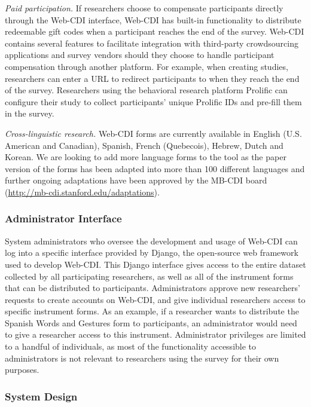 \documentclass[
  english,
  man]{apa7}
\begin{document}
\emph{Paid participation.} If researchers choose to compensate participants directly through the Web-CDI interface, Web-CDI has built-in functionality to distribute redeemable gift codes when a participant reaches the end of the survey. Web-CDI contains several features to facilitate integration with third-party crowdsourcing applications and survey vendors should they choose to handle participant compensation through another platform. For example, when creating studies, researchers can enter a URL to redirect participants to when they reach the end of the survey. Researchers using the behavioral research platform Prolific can configure their study to collect participants' unique Prolific IDs and pre-fill them in the survey.

\emph{Cross-linguistic research.} Web-CDI forms are currently available in English (U.S. American and Canadian), Spanish, French (Quebecois), Hebrew, Dutch and Korean. We are looking to add more language forms to the tool as the paper version of the forms has been adapted into more than 100 different languages and further ongoing adaptations have been approved by the MB-CDI board (\url{http://mb-cdi.stanford.edu/adaptations}).

\hypertarget{administrator-interface}{%
\subsubsection{Administrator Interface}\label{administrator-interface}}

System administrators who oversee the development and usage of Web-CDI can log into a specific interface provided by Django, the open-source web framework used to develop Web-CDI. This Django interface gives access to the entire dataset collected by all participating researchers, as well as all of the instrument forms that can be distributed to participants. Administrators approve new researchers' requests to create accounts on Web-CDI, and give individual researchers access to specific instrument forms. As an example, if a researcher wants to distribute the Spanish Words and Gestures form to participants, an administrator would need to give a researcher access to this instrument. Administrator privileges are limited to a handful of individuals, as most of the functionality accessible to administrators is not relevant to researchers using the survey for their own purposes.

\hypertarget{system-design}{%
\subsubsection{System Design}\label{system-design}}
\end{document}
